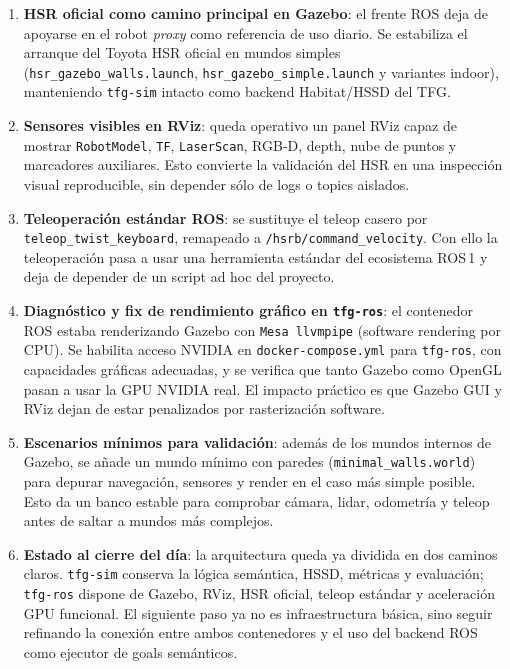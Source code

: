 \documentclass[11pt,a4paper]{article}
\begin{document}
\begin{enumerate}
  \item \textbf{HSR oficial como camino principal en Gazebo}: el frente ROS deja
        de apoyarse en el robot \emph{proxy} como referencia de uso diario. Se
        estabiliza el arranque del Toyota HSR oficial en mundos simples
        (\texttt{hsr\_gazebo\_walls.launch}, \texttt{hsr\_gazebo\_simple.launch}
        y variantes indoor), manteniendo \texttt{tfg-sim} intacto como backend
        Habitat/HSSD del TFG.
  \item \textbf{Sensores visibles en RViz}: queda operativo un panel RViz capaz
        de mostrar \texttt{RobotModel}, \texttt{TF}, \texttt{LaserScan},
        RGB-D, depth, nube de puntos y marcadores auxiliares. Esto convierte la
        validación del HSR en una inspección visual reproducible, sin depender
        sólo de logs o topics aislados.
  \item \textbf{Teleoperación estándar ROS}: se sustituye el teleop casero por
        \texttt{teleop\_twist\_keyboard}, remapeado a
        \texttt{/hsrb/command\_velocity}. Con ello la teleoperación pasa a usar
        una herramienta estándar del ecosistema ROS\,1 y deja de depender de un
        script ad hoc del proyecto.
  \item \textbf{Diagnóstico y fix de rendimiento gráfico en \texttt{tfg-ros}}:
        el contenedor ROS estaba renderizando Gazebo con
        \texttt{Mesa llvmpipe} (software rendering por CPU). Se habilita acceso
        NVIDIA en \texttt{docker-compose.yml} para \texttt{tfg-ros}, con
        capacidades gráficas adecuadas, y se verifica que tanto Gazebo como
        OpenGL pasan a usar la GPU NVIDIA real. El impacto práctico es que
        Gazebo GUI y RViz dejan de estar penalizados por rasterización software.
  \item \textbf{Escenarios mínimos para validación}: además de los mundos
        internos de Gazebo, se añade un mundo mínimo con paredes
        (\texttt{minimal\_walls.world}) para depurar navegación, sensores y
        render en el caso más simple posible. Esto da un banco estable para
        comprobar cámara, lidar, odometría y teleop antes de saltar a mundos más
        complejos.
  \item \textbf{Estado al cierre del día}: la arquitectura queda ya dividida en
        dos caminos claros. \texttt{tfg-sim} conserva la lógica semántica,
        HSSD, métricas y evaluación; \texttt{tfg-ros} dispone de Gazebo, RViz,
        HSR oficial, teleop estándar y aceleración GPU funcional. El siguiente
        paso ya no es infraestructura básica, sino seguir refinando la conexión
        entre ambos contenedores y el uso del backend ROS como ejecutor de goals
        semánticos.
\end{enumerate}
\end{document}
